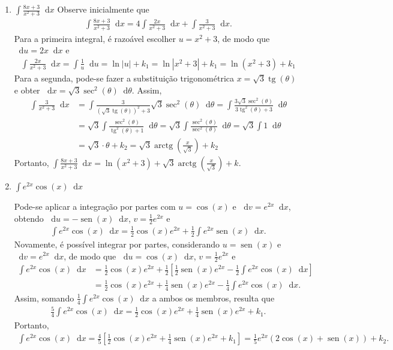\documentclass[12pt,a4paper]{article}
\newcommand*\diff{\mathop{}\!\mathrm{d}}
\newcommand*\sen{\operatorname{sen}}
\newcommand*\tg{\operatorname{tg}}
\newcommand*\arctg{\operatorname{arctg}}
\begin{document}
\begin{enumerate}
\begin{enumerate}
\item $\displaystyle \int \frac{8x+3}{x^2+3} \diff x$
Observe inicialmente que
\begin{align*}
  \int \frac{8x+3}{x^2+3} \diff x
= 4 \int \frac{2x}{x^2+3} \diff x + \int \frac{3}{x^2+3} \diff x.
\end{align*}
Para a primeira integral, é razoável escolher $u = x^2+3$, de modo que $\diff u = 2x \diff x$ e
\begin{align*}
  \int \frac{2x}{x^2+3} \diff x
= \int \frac{1}{u} \diff u
= \ln|u| + k_1
= \ln|x^2 + 3| + k_1
= \ln(x^2 + 3) + k_1
\end{align*}
Para a segunda, pode-se fazer a substituição trigonométrica $x = \sqrt{3} \tg(\theta)$ e obter $\diff x =\sqrt{3} \sec^2(\theta)\diff \theta$. Assim,
\begin{align*}
    \int \frac{3}{x^2+3} \diff x
& = \int \frac{3}{(\sqrt{3} \tg(\theta))^2+3} \sqrt{3} \sec^2(\theta)\diff \theta
  = \int \frac{3 \sqrt{3} \sec^2(\theta)}{3\tg^2(\theta)+3} \diff \theta \\
& = \sqrt{3} \int \frac{ \sec^2(\theta) }{ \tg^2(\theta) + 1 } \diff \theta
  = \sqrt{3} \int \frac{ \sec^2(\theta) }{ \sec^2(\theta)    } \diff \theta
  = \sqrt{3} \int 1 \diff \theta \\
& = \sqrt{3} \cdot \theta + k_2
  = \sqrt{3}\arctg\left(\frac{x}{\sqrt{3}}\right) + k_2
\end{align*}
Portanto, $\int \frac{8x+3}{x^2+3} \diff x
= \ln(x^2 + 3) + \sqrt{3}\arctg\left(\frac{x}{\sqrt{3}}\right) + k$.

\item $\displaystyle \int e^{2x} \cos(x) \diff x$

Pode-se aplicar a integração por partes com $u = \cos(x)$ e $\diff v = e^{2x} \diff x$, obtendo $\diff u = -\sen(x) \diff x$, $v = \frac{1}{2} e^{2x}$ e
\begin{align*}
  \int e^{2x} \cos(x) \diff x
= \frac{1}{2}\cos(x) e^{2x} + \frac{1}{2} \int e^{2x} \sen(x) \diff x.
\end{align*}
Novamente, é possível integrar por partes, considerando $u = \sen(x)$ e $\diff v = e^{2x} \diff x$, de modo que $\diff u = \cos(x) \diff x$, $v = \frac{1}{2} e^{2x}$ e
\begin{align*}
    \int e^{2x} \cos(x) \diff x
& = \frac{1}{2}\cos(x) e^{2x} + \frac{1}{2} \left[
\frac{1}{2}\sen(x) e^{2x} - \frac{1}{2} \int e^{2x} \cos(x) \diff x
\right] \\
& = \frac{1}{2}\cos(x) e^{2x}
  + \frac{1}{4}\sen(x) e^{2x}
  - \frac{1}{4}\int e^{2x} \cos(x) \diff x.
\end{align*}
Assim, somando $\frac{1}{4}\int e^{2x} \cos(x) \diff x$ a ambos os membros, resulta que
\begin{align*}
\frac{5}{4} \int e^{2x} \cos(x) \diff x
= \frac{1}{2}\cos(x) e^{2x}
+ \frac{1}{4}\sen(x) e^{2x} + k_1.
\end{align*}
Portanto,
\begin{align*}
  \int e^{2x} \cos(x) \diff x
= \frac{4}{5} \left[
    \frac{1}{2}\cos(x) e^{2x}
  + \frac{1}{4} \sen(x) e^{2x} + k_1
\right]
  = \frac{1}{5} e^{2x} (2 \cos(x) + \sen(x)) + k_2.
\end{align*}


\end{enumerate}
\end{enumerate}
\end{document}
